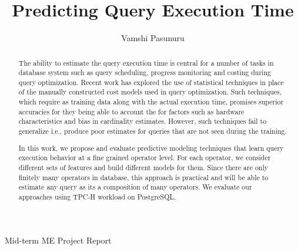 \documentclass{article}
\title{\large \bf Predicting Query Execution Time }
\author{Vamshi Pasunuru}
\date{}
\begin{document}
	\maketitle
    \begin{center}
        Mid-term ME Project Report
    \end{center}
        \vskip 12pt
	\thispagestyle{empty}
	
	\begin{abstract}
	The ability to estimate the query execution time is central for a number of tasks in database system
	such as query scheduling, progress monitoring and costing during query optimization. Recent work 
	has explored the use of statistical techniques in place of the manually constructed cost models used 
	in query optimization. Such techniques, which require as training data along with the 
	actual execution time, promises superior accuracies for they being able to account the for factors 
	such as hardware characteristics and bias in cardinality estimates. However, such techniques fail 
	to generalize i.e., produce poor estimates for queries that are not seen during the training.
	
	In this work, we propose and evaluate predictive modeling techniques that learn query 
	execution behavior at a fine grained operator level. For each operator, we consider different sets 
	of features and build different models for them. Since there are only finitely many operators in 
	database, this approach is practical and will be able to estimate any query as its a composition of
	many operators. We evaluate our approaches using TPC-H workload on PostgreSQL.

	\end{abstract}		
	\hfill 
\end{document}
